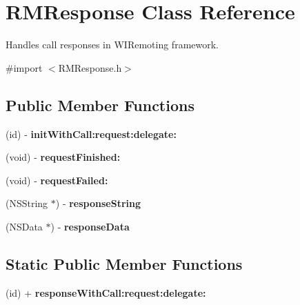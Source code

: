 \hypertarget{interface_r_m_response}{
\section{RMResponse Class Reference}
\label{interface_r_m_response}
}


Handles call responses in WIRemoting framework.  


{\ttfamily \#import $<$RMResponse.h$>$}\subsection*{Public Member Functions}
\begin{DoxyCompactItemize}
\item 
\hypertarget{interface_r_m_response_a0f3e33e889c76f99c085b8a356dff03f}{
(id) -\/ {\bfseries initWithCall:request:delegate:}}
\label{interface_r_m_response_a0f3e33e889c76f99c085b8a356dff03f}

\item 
\hypertarget{interface_r_m_response_a9c0cb2ff676b85a95a880810222dc38e}{
(void) -\/ {\bfseries requestFinished:}}
\label{interface_r_m_response_a9c0cb2ff676b85a95a880810222dc38e}

\item 
\hypertarget{interface_r_m_response_a72bce836d142fbe400db06a9683e9d64}{
(void) -\/ {\bfseries requestFailed:}}
\label{interface_r_m_response_a72bce836d142fbe400db06a9683e9d64}

\item 
\hypertarget{interface_r_m_response_a647ba0ba05412d71c6cf8bd144b656ef}{
(NSString $\ast$) -\/ {\bfseries responseString}}
\label{interface_r_m_response_a647ba0ba05412d71c6cf8bd144b656ef}

\item 
\hypertarget{interface_r_m_response_a945e816c61e871826ef46689cd78d857}{
(NSData $\ast$) -\/ {\bfseries responseData}}
\label{interface_r_m_response_a945e816c61e871826ef46689cd78d857}

\end{DoxyCompactItemize}
\subsection*{Static Public Member Functions}
\begin{DoxyCompactItemize}
\item 
\hypertarget{interface_r_m_response_a6281bc247a32f1bda98b708eae184887}{
(id) + {\bfseries responseWithCall:request:delegate:}}
\label{interface_r_m_response_a6281bc247a32f1bda98b708eae184887}

\end{DoxyCompactItemize}
